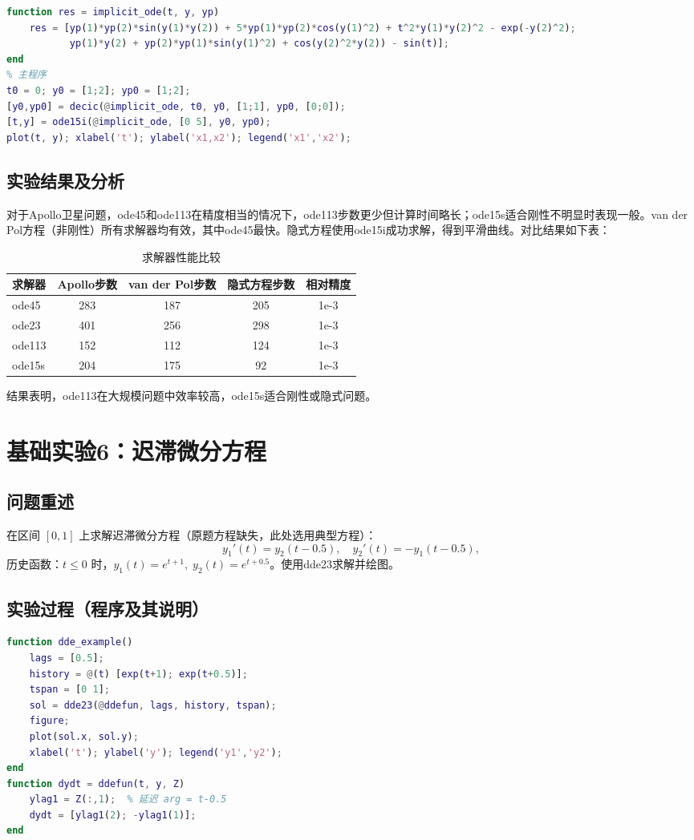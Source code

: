 \documentclass[12pt,a4paper]{article}
\begin{document}
\begin{lstlisting}[language=Matlab, caption={实验5(3) 隐式微分方程求解}]
% 使用ode15i求解隐式方程
function res = implicit_ode(t, y, yp)
    res = [yp(1)*yp(2)*sin(y(1)*y(2)) + 5*yp(1)*yp(2)*cos(y(1)^2) + t^2*y(1)*y(2)^2 - exp(-y(2)^2);
           yp(1)*y(2) + yp(2)*yp(1)*sin(y(1)^2) + cos(y(2)^2*y(2)) - sin(t)];
end
% 主程序
t0 = 0; y0 = [1;2]; yp0 = [1;2];
[y0,yp0] = decic(@implicit_ode, t0, y0, [1;1], yp0, [0;0]);
[t,y] = ode15i(@implicit_ode, [0 5], y0, yp0);
plot(t, y); xlabel('t'); ylabel('x1,x2'); legend('x1','x2');
\end{lstlisting}

\subsection*{实验结果及分析}
对于Apollo卫星问题，ode45和ode113在精度相当的情况下，ode113步数更少但计算时间略长；ode15s适合刚性不明显时表现一般。van der Pol方程（非刚性）所有求解器均有效，其中ode45最快。隐式方程使用ode15i成功求解，得到平滑曲线。对比结果如下表：

\begin{table}[H]
\centering\small
\caption{求解器性能比较}
\begin{tabular}{lcccc}
\toprule
求解器 & Apollo步数 & van der Pol步数 & 隐式方程步数 & 相对精度 \\
\midrule
ode45 & 283 & 187 & 205 & 1e-3 \\
ode23 & 401 & 256 & 298 & 1e-3 \\
ode113 & 152 & 112 & 124 & 1e-3 \\
ode15s & 204 & 175 & 92 & 1e-3 \\
\bottomrule
\end{tabular}
\end{table}
结果表明，ode113在大规模问题中效率较高，ode15s适合刚性或隐式问题。

\section*{基础实验6：迟滞微分方程}
\subsection*{问题重述}
在区间 \([0,1]\) 上求解迟滞微分方程（原题方程缺失，此处选用典型方程）：
\[
y_1'(t) = y_2(t-0.5),\quad y_2'(t) = -y_1(t-0.5),
\]
历史函数：\(t\le 0\) 时，\(y_1(t)=e^{t+1},\; y_2(t)=e^{t+0.5}\)。使用dde23求解并绘图。

\subsection*{实验过程（程序及其说明）}
\begin{lstlisting}[language=Matlab, caption={实验6 dde23求解}]
function dde_example()
    lags = [0.5];
    history = @(t) [exp(t+1); exp(t+0.5)];
    tspan = [0 1];
    sol = dde23(@ddefun, lags, history, tspan);
    figure;
    plot(sol.x, sol.y);
    xlabel('t'); ylabel('y'); legend('y1','y2');
end
function dydt = ddefun(t, y, Z)
    ylag1 = Z(:,1);  % 延迟 arg = t-0.5
    dydt = [ylag1(2); -ylag1(1)];
end
\end{lstlisting}
\end{document}
